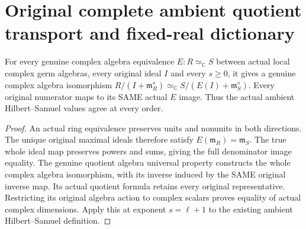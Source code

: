 \section{Original complete ambient quotient transport and fixed-real dictionary}

\begin{theorem}
\label{hir:smooth-centre-actual-whole-ambient-jet-transport}
\leanok
For every genuine complex algebra equivalence $E:R\simeq_{\mathbb C}S$
between actual local complex germ algebras, every original ideal $I$ and
every $s\geq0$, it gives a genuine complex algebra isomorphism
$R/(I+\mathfrak m_R^s)\simeq_{\mathbb C}
S/(E(I)+\mathfrak m_S^s)$. Every original numerator maps to its SAME
actual $E$ image. Thus the actual ambient Hilbert--Samuel values agree at
every order.
\end{theorem}
\begin{proof}
An actual ring equivalence preserves units and nonunits in both directions.
The unique original maximal ideals therefore satisfy
$E(\mathfrak m_R)=\mathfrak m_S$. The true whole ideal map preserves powers
and sums, giving the full denominator image equality. The genuine quotient
algebra universal property constructs the whole complex algebra isomorphism,
with its inverse induced by the SAME original inverse map. Its actual
quotient formula retains every original representative. Restricting its
original algebra action to complex scalars proves equality of actual complex
dimensions. Apply this at exponent $s=\ell+1$ to the existing ambient
Hilbert--Samuel definition.
\end{proof}

